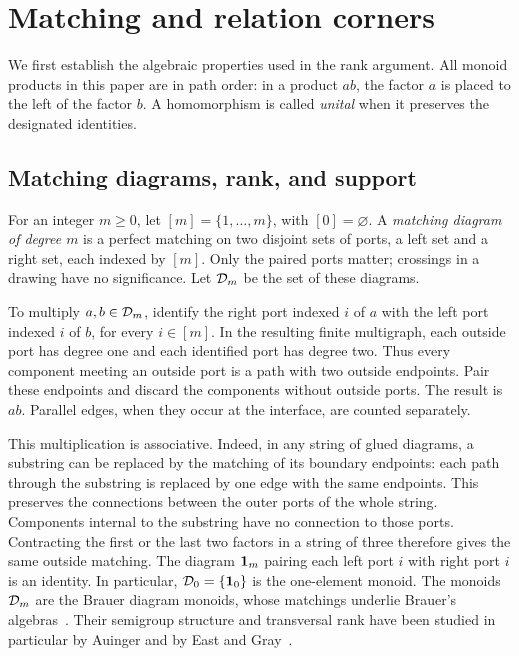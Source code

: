 \section{Matching and relation corners}
\label{sec:matching}

We first establish the algebraic properties used in the rank argument.
All monoid products in this paper are in path order: in a product $ab$,
the factor $a$ is placed to the left of the factor $b$.
A homomorphism is called \emph{unital} when it preserves the designated
identities.

\subsection{Matching diagrams, rank, and support}

For an integer $m\geq 0$, let $[m]=\{1,\ldots,m\}$, with
$[0]=\varnothing$.  A \emph{matching diagram of degree $m$} is a perfect
matching on two disjoint sets of ports, a left set and a right set, each
indexed by $[m]$.  Only the paired ports matter; crossings in a drawing
have no significance.  Let $\mathcal D_{m}$ be the set of these diagrams.

To multiply $a,b\in\mathcal D_{m}$, identify the right port indexed $i$ of $a$
with the left port indexed $i$ of $b$, for every $i\in[m]$.  In the
resulting finite multigraph, each outside port has degree one and each
identified port has degree two.  Thus every component meeting an outside
port is a path with two outside endpoints.  Pair these endpoints and
discard the components without outside ports.  The result is $ab$.
Parallel edges, when they occur at the interface, are counted separately.

This multiplication is associative.  Indeed, in any string of glued
diagrams, a substring can be replaced by the matching of its boundary
endpoints: each path through the substring is replaced by one edge with
the same endpoints.  This preserves the connections between the outer
ports of the whole string.  Components internal to the substring have
no connection to those ports.  Contracting the first or the last two
factors in a string of three therefore gives the same outside matching.
The diagram $\mathbf 1_m$ pairing each left port $i$ with right port $i$ is
an identity.  In particular, $\mathcal D_{0}=\{\mathbf 1_0\}$ is the one-element
monoid.  The monoids $\mathcal D_{m}$ are the Brauer diagram
monoids, whose matchings underlie Brauer's
algebras~\cite{Brauer1937}. Their semigroup structure and transversal
rank have been studied in particular by Auinger and by East and
Gray~\cite{Auinger2012,EastGray2017}.

